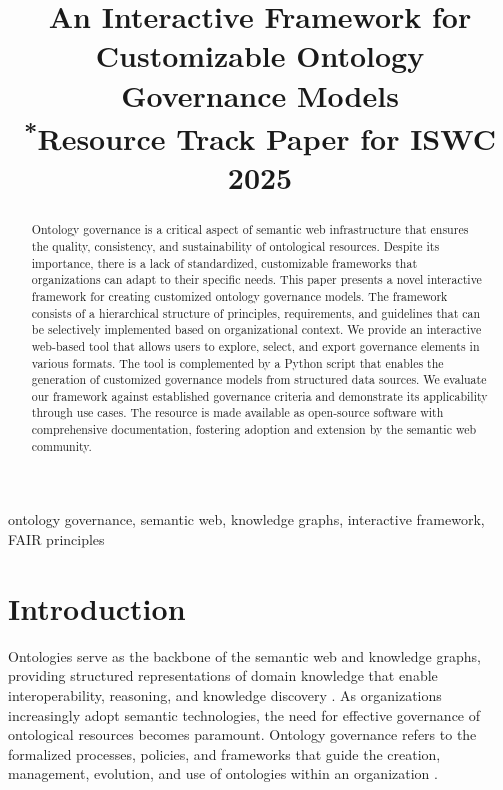 \documentclass[conference]{IEEEtran}
\begin{document}
\title{An Interactive Framework for Customizable Ontology Governance Models\\
{\footnotesize \textsuperscript{*}Resource Track Paper for ISWC 2025}
}

\author{
\and
{}
}

\maketitle

\begin{abstract}
Ontology governance is a critical aspect of semantic web infrastructure that ensures the quality, consistency, and sustainability of ontological resources. Despite its importance, there is a lack of standardized, customizable frameworks that organizations can adapt to their specific needs. This paper presents a novel interactive framework for creating customized ontology governance models. The framework consists of a hierarchical structure of principles, requirements, and guidelines that can be selectively implemented based on organizational context. We provide an interactive web-based tool that allows users to explore, select, and export governance elements in various formats. The tool is complemented by a Python script that enables the generation of customized governance models from structured data sources. We evaluate our framework against established governance criteria and demonstrate its applicability through use cases. The resource is made available as open-source software with comprehensive documentation, fostering adoption and extension by the semantic web community.
\end{abstract}

\begin{IEEEkeywords}
ontology governance, semantic web, knowledge graphs, interactive framework, FAIR principles
\end{IEEEkeywords}

\section{Introduction}
Ontologies serve as the backbone of the semantic web and knowledge graphs, providing structured representations of domain knowledge that enable interoperability, reasoning, and knowledge discovery \cite{gruber1993translation}. As organizations increasingly adopt semantic technologies, the need for effective governance of ontological resources becomes paramount. Ontology governance refers to the formalized processes, policies, and frameworks that guide the creation, management, evolution, and use of ontologies within an organization \cite{de2020ontology}.
\end{document}
